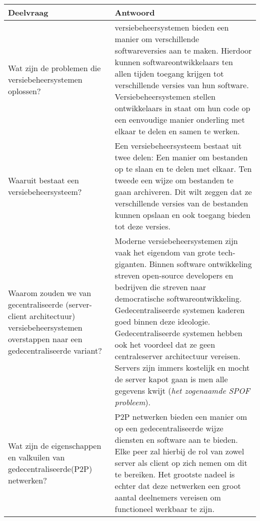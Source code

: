\begin{table}[h!]
\begin{tabularx}{\linewidth}{ |X|X| }
\hline
Deelvraag & Antwoord \\ \hline
Wat zijn de problemen die versiebeheersystemen oplossen? & 
versiebeheersystemen bieden een manier om verschillende softwareversies aan te maken. Hierdoor kunnen softwareontwikkelaars ten allen tijden toegang krijgen tot verschillende versies van hun software. Versiebeheersystemen stellen ontwikkelaars in staat om hun code op een eenvoudige manier onderling met elkaar te delen en samen te werken.\\ \hline
Waaruit bestaat een versiebeheersysteem? & Een versiebeheersysteem bestaat uit twee delen: Een manier om bestanden op te slaan en te delen met elkaar. Ten tweede een wijze om bestanden te gaan archiveren. Dit wilt zeggen dat ze verschillende versies van de bestanden kunnen opslaan en ook toegang bieden tot deze versies.\\ \hline
Waarom zouden we van gecentraliseerde (server-client architectuur) versiebeheersystemen overstappen naar een gedecentraliseerde variant?         & Moderne versiebeheersystemen zijn vaak het eigendom van grote tech-giganten. Binnen software ontwikkeling streven open-source developers en bedrijven die streven naar democratische softwareontwikkeling. Gedecentraliseerde systemen kaderen goed binnen deze ideologie. Gedecentraliseerde systemen hebben ook het voordeel dat ze geen centraleserver architectuur vereisen. Servers zijn immers kostelijk en mocht de server kapot gaan is men alle gegevens kwijt (\textit{het zogenaamde SPOF probleem}).\\ \hline
Wat zijn de eigenschappen en valkuilen van gedecentraliseerde(P2P) netwerken? & P2P netwerken bieden een manier om op een gedecentraliseerde wijze diensten en software aan te bieden. Elke peer zal hierbij de rol van zowel server als client op zich nemen om dit te bereiken. Het grootste nadeel is echter dat deze netwerken een groot aantal deelnemers vereisen om functioneel werkbaar te zijn.\\ \hline
\end{tabularx}
\end{table} 
\newpage
